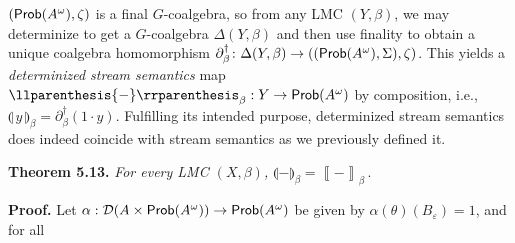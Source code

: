 \documentclass[11pt,a4paper]{amsart}
\begin{document}
\hypertarget{html:S5.SS0.SSS0.Px2.p5.m1}{}\({(\text{\sf Prob}(A^{\omega}),\zeta)}\) is a final %
\hypertarget{html:S5.SS0.SSS0.Px2.p5.m2}{}\({G}\)-coalgebra, so from any LMC %
\hypertarget{html:S5.SS0.SSS0.Px2.p5.m3}{}\({(Y,\beta)}\), we may determinize to get a %
\hypertarget{html:S5.SS0.SSS0.Px2.p5.m4}{}\({G}\)-coalgebra %
\hypertarget{html:S5.SS0.SSS0.Px2.p5.m5}{}\({\Delta(Y,\beta)}\) and then use finality to obtain a unique coalgebra homomorphism %
\hypertarget{html:S5.SS0.SSS0.Px2.p5.m6}{}\({\partial_{\beta}^{\dagger}\colon\Delta(Y,\beta)\to((\text{\sf Prob}(A^{\omega}),\Sigma),\zeta)}\). This yields a \emph{determinized stream semantics} map %
\hypertarget{html:S5.SS0.SSS0.Px2.p5.m7}{}\({\llparenthesis{-}\rrparenthesis_{\beta}:Y\to\text{\sf Prob}(A^{\omega})}\) by composition, i.e., %
\hypertarget{html:S5.SS0.SSS0.Px2.p5.m8}{}\({\llparenthesis{\,y\,}\rrparenthesis_{\beta}=\partial_{\beta}^{\dagger}(1\cdot y)}\). Fulfilling its intended purpose, determinized stream semantics does indeed coincide with stream semantics as we previously defined it.
\par\medskip
\hypertarget{html:S5.Thmtheorem13}{} \par\noindent\textbf{\textbf{Theorem 5.13}\textbf{.}}\quad  %
\hypertarget{html:S5.Thmtheorem13.p1}{} \emph{For every LMC %
\hypertarget{html:S5.Thmtheorem13.p1.m1}{}\({(X,\beta)}\), %
\hypertarget{html:S5.Thmtheorem13.p1.m2}{}\({\llparenthesis{-}\rrparenthesis_{\beta}=\left\llbracket{-}\right\rrbracket_{\beta}\,.}\)}
\par\medskip
\hypertarget{html:S5.SS0.SSS0.Px2.SPx1}{} \par\noindent\textbf{Proof.}\quad  %
\hypertarget{html:S5.SS0.SSS0.Px2.SPx1.p1}{} Let %
\hypertarget{html:S5.SS0.SSS0.Px2.SPx1.p1.m1}{}\({\alpha:{\mathcal{D}}(A\times\text{\sf Prob}(A^{\omega}))\to\text{\sf Prob}(A^{\omega})}\) be given by %
\hypertarget{html:S5.SS0.SSS0.Px2.SPx1.p1.m2}{}\({\alpha(\theta)(B_{\varepsilon})=1}\), and for all %
\end{document}
